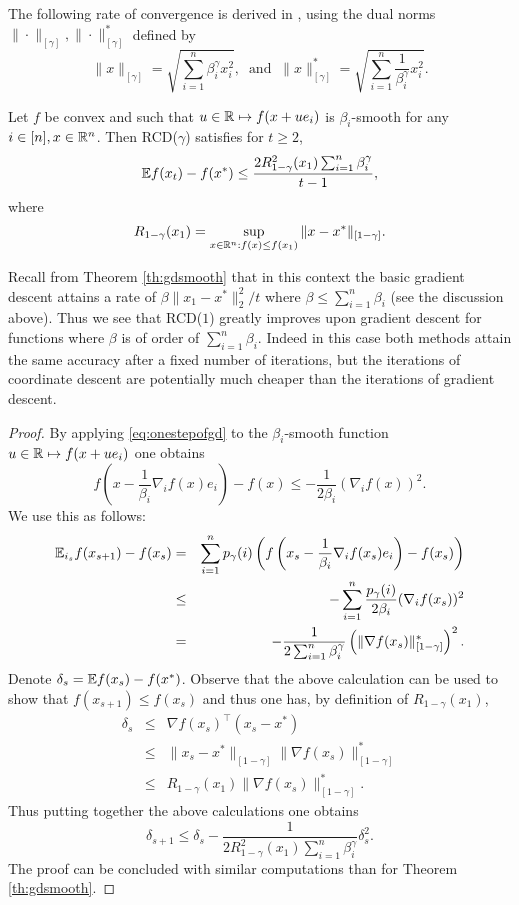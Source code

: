 The following rate of convergence is derived in \cite{Nes12}, using the dual norms $\|\cdot\|_{[\gamma]}, \|\cdot\|_{[\gamma]}^*$ defined by
$$\|x\|_{[\gamma]} = \sqrt{\sum_{i=1}^n \beta_i^{\gamma} x_i^2} , \;\; \text{and} \;\; \|x\|_{[\gamma]}^* = \sqrt{\sum_{i=1}^n \frac1{\beta_i^{\gamma}} x_i^2} .$$

\begin{theorem} \label{th:rcdgamma}
Let $f$ be convex and such that $u \in \mathbb{R} \mapsto f(x + u e_i)$ is $\beta_i$-smooth for any $i \in [n], x \in \mathbb{R}^n$. Then RCD($\gamma$) satisfies for $t \geq 2$,
$$\mathbb{E} f(x_{t}) - f(x^*) \leq \frac{2 R_{1 - \gamma}^2(x_1) \sum_{i=1}^n \beta_i^{\gamma}}{t-1} ,$$
where
$$R_{1-\gamma}(x_1) = \sup_{x \in \mathbb{R}^n : f(x) \leq f(x_1)} \|x - x^*\|_{[1-\gamma]} .$$
\end{theorem}
Recall from Theorem \ref{th:gdsmooth} that in this context the basic gradient descent attains a rate of $\beta \|x_1 - x^*\|_2^2 / t$ where $\beta \leq \sum_{i=1}^n \beta_i$ (see the discussion above). Thus we see that RCD($1$) greatly improves upon gradient descent for functions where $\beta$ is of order of $\sum_{i=1}^n \beta_i$. Indeed in this case both methods attain the same accuracy after a fixed number of iterations, but the iterations of coordinate descent are potentially much cheaper than the iterations of gradient descent. 
\begin{proof}
By applying \eqref{eq:onestepofgd} to the $\beta_i$-smooth function $u \in \mathbb{R} \mapsto f(x + u e_i)$ one obtains
$$f\left(x - \frac{1}{\beta_i} \nabla_i f(x) e_i\right) - f(x) \leq - \frac{1}{2 \beta_i} (\nabla_i f(x))^2 .$$
We use this as follows:
\begin{eqnarray*}
\mathbb{E}_{i_s} f(x_{s+1}) - f(x_s)
& = & \sum_{i=1}^n p_{\gamma}(i) \left(f\left(x_s - \frac{1}{\beta_i} \nabla_i f(x_s) e_i\right) - f(x_s) \right) \\
& \leq & - \sum_{i=1}^n \frac{p_{\gamma}(i)}{2 \beta_i} (\nabla_i f(x_s))^2 \\
& = & - \frac{1}{2 \sum_{i=1}^n \beta_i^{\gamma}} \left(\|\nabla f(x_s)\|_{[1-\gamma]}^*\right)^2 .
\end{eqnarray*}
Denote $\delta_s = \mathbb{E} f(x_s) - f(x^*)$. Observe that the above calculation can be used to show that $f(x_{s+1}) \leq f(x_s)$ and thus one has, by definition of $R_{1-\gamma}(x_1)$,
\begin{eqnarray*} 
\delta_s & \leq & \nabla f(x_s)^{\top} (x_s - x^*) \\
& \leq & \|x_s - x^*\|_{[1-\gamma]} \|\nabla f(x_s)\|_{[1-\gamma]}^* \\
& \leq & R_{1-\gamma}(x_1) \|\nabla f(x_s)\|_{[1-\gamma]}^* .
\end{eqnarray*}
Thus putting together the above calculations one obtains
$$\delta_{s+1} \leq \delta_s - \frac{1}{2 R_{1 - \gamma}^2(x_1) \sum_{i=1}^n \beta_i^{\gamma} } \delta_s^2 .$$
The proof can be concluded with similar computations than for Theorem \ref{th:gdsmooth}.
\end{proof}

